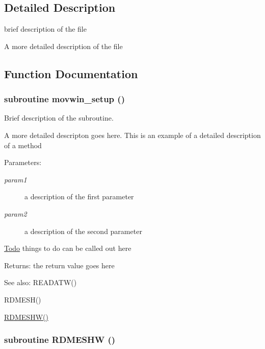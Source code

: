 \subsection{Detailed Description}
brief description of the file 

A more detailed description of the file 

\subsection{Function Documentation}
\hypertarget{movwin_8F_cd12f456fef33becb50793608b263021}{
\subsubsection[movwin\_\-setup]{\setlength{\rightskip}{0pt plus 5cm}subroutine movwin\_\-setup ()}}
\label{movwin_8F_cd12f456fef33becb50793608b263021}


Brief description of the subroutine. 

A more detailed descripton goes here. This is an example of a detailed description of a method

\begin{Desc}
\item[Parameters:]
\begin{description}
\item[{\em param1}]a description of the first parameter \item[{\em param2}]a description of the second parameter \end{description}
\end{Desc}
\begin{Desc}
\item[\hyperlink{todo__todo000003}{Todo}]things to do can be called out here \end{Desc}
\begin{Desc}
\item[Returns:]the return value goes here \end{Desc}
\begin{Desc}
\item[See also:]READATW() 

RDMESH() 

\hyperlink{movwin_8F_da38f8a5d8e3a060270b20f61e8a2a48}{RDMESHW()} \end{Desc}
\hypertarget{movwin_8F_da38f8a5d8e3a060270b20f61e8a2a48}{
\subsubsection[RDMESHW]{\setlength{\rightskip}{0pt plus 5cm}subroutine RDMESHW ()}}
\label{movwin_8F_da38f8a5d8e3a060270b20f61e8a2a48}


